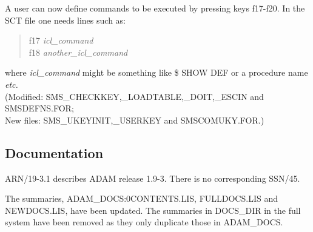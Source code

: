 A user can now define commands to be executed by pressing keys f17-f20. In
the SCT file one needs lines such as:
\begin{quote}
f17  {\em icl\_command}\\
f18  {\em another\_icl\_command}
\end{quote}
where {\em icl\_command} might be something like \$ SHOW DEF or a procedure 
name {\em etc.}\\
(Modified: SMS\_CHECKKEY,\_LOADTABLE,\_DOIT,\_ESCIN and SMSDEFNS.FOR; \\
New files: SMS\_UKEYINIT,\_USERKEY and SMSCOMUKY.FOR.)

\subsection{Documentation}
ARN/19-3.1 describes ADAM release 1.9-3.
There is no corresponding SSN/45.

The summaries, ADAM\_DOCS:0CONTENTS.LIS, FULLDOCS.LIS and NEWDOCS.LIS, have 
been updated. The summaries in DOCS\_DIR in the full system have been
removed as they only duplicate those in ADAM\_DOCS.



